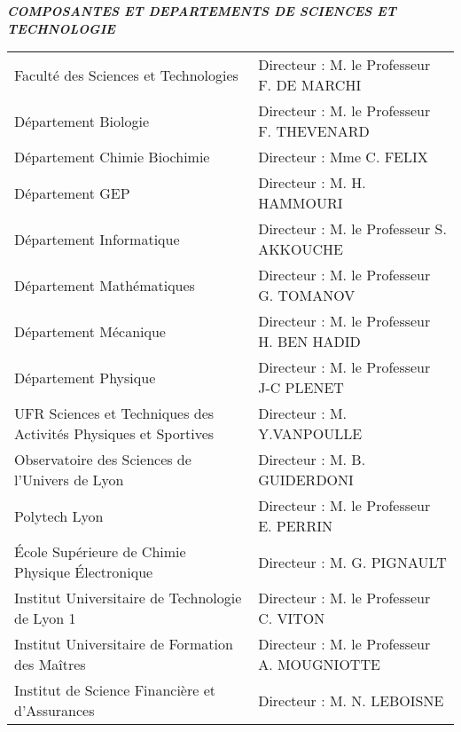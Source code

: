 \vfill
\begin{minipage}{0.95\textwidth}
\begin{center}
\vspace{0.5cm}
\textit{\textbf{COMPOSANTES ET DEPARTEMENTS DE SCIENCES ET TECHNOLOGIE}}
\vspace{0.2cm}
\begin{footnotesize}
\begin{tabular}{p{8cm}p{6.75cm}}
Faculté des Sciences et Technologies & Directeur : M. le Professeur F. DE MARCHI\\
Département Biologie & Directeur : M. le Professeur F. THEVENARD\\
Département Chimie Biochimie & Directeur : Mme C. FELIX\\
Département GEP & Directeur : M. H. HAMMOURI\\
Département Informatique & Directeur : M. le Professeur S. AKKOUCHE\\
Département Mathématiques & Directeur : M. le Professeur G. TOMANOV\\
Département Mécanique & Directeur : M. le Professeur H. BEN HADID\\
Département Physique & Directeur :  M. le Professeur J-C PLENET \\
UFR Sciences et Techniques des Activités Physiques et Sportives & Directeur : M. Y.VANPOULLE   \\
Observatoire des Sciences de l’Univers de Lyon & Directeur : M. B. GUIDERDONI \\
Polytech Lyon & Directeur : M. le Professeur E. PERRIN\\
École Supérieure de Chimie Physique Électronique & Directeur : M. G. PIGNAULT\\
Institut Universitaire de Technologie de Lyon 1 & Directeur : M. le Professeur C. VITON\\
Institut Universitaire de Formation des Maîtres & Directeur : M. le Professeur A. MOUGNIOTTE\\
Institut de Science Financière et d'Assurances & Directeur : M. N. LEBOISNE
\end{tabular}
\end{footnotesize}
\end{center}
\end{minipage}
\newpage\thispagestyle{empty}
\null
\newpage

\endgroup
\restoregeometry
